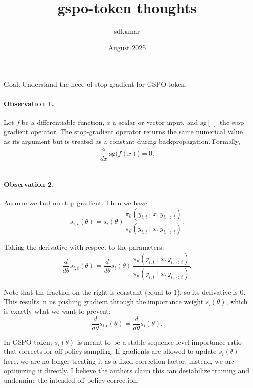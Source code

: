 \documentclass{article}
\title{gspo-token thoughts}
\author{sdkumar }
\date{August 2025}
\begin{document}
Goal: Understand the need of stop gradient for GSPO-token. \\

\paragraph{Observation 1.}
Let $f$ be a differentiable function, $x$ a scalar or vector input, and $\mathrm{sg}[\cdot]$ the stop-gradient operator. 
The stop-gradient operator returns the same numerical value as its argument but is treated as a constant during backpropagation. 
Formally,
\[
\frac{d}{dx} \,\mathrm{sg}\!\big(f(x)\big) = 0.
\] \\



\paragraph{Observation 2.}
Assume we had no stop gradient. Then we have
\[
s_{i,t}(\theta) 
= s_{i}(\theta) \,
\frac{\pi_{\theta}(y_{i,t} \mid x, y_{i,<t})}
     {\pi_{\theta}(y_{i,t} \mid x, y_{i,<t})}.
\]

Taking the derivative with respect to the parameters:
\[
\frac{d}{d\theta} s_{i,t}(\theta) 
= \frac{d}{d\theta} s_{i}(\theta) \,
\frac{\pi_{\theta}(y_{i,t} \mid x, y_{i,<t})}
     {\pi_{\theta}(y_{i,t} \mid x, y_{i,<t})}.
\]

Note that the fraction on the right is constant (equal to $1$), so its derivative is $0$. 
This results in us pushing gradient through the importance weight $s_i(\theta)$, which is exactly what we want to prevent:
\[
\frac{d}{d\theta} s_{i,t}(\theta) 
= \frac{d}{d\theta} s_{i}(\theta).
\]

In GSPO-token, $s_i(\theta)$ is meant to be a stable
sequence-level importance ratio that corrects for off-policy sampling. If gradients are allowed
to update $s_i(\theta)$ here, we are no longer treating it as a fixed correction factor.  Instead,
we are optimizing it directly. I believe the authors claim this can destabilize training and undermine
the intended off-policy correction.
\end{document}
